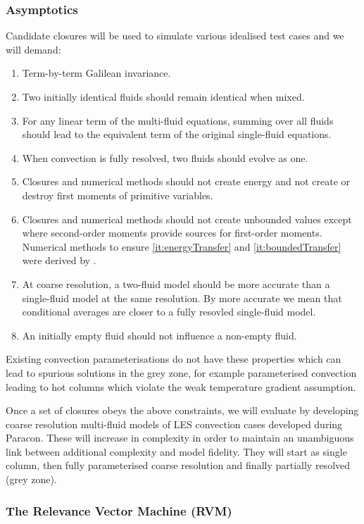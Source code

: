 \documentclass[11pt,a4paper]{article}
\begin{document}
\subsubsection*{Asymptotics}

Candidate closures will be used to simulate various idealised test cases and we will demand:
\begin{enumerate}
\item Term-by-term Galilean invariance.
\item Two initially identical fluids should remain identical when mixed.
\item For any linear term of the multi-fluid equations, summing over all fluids should lead to the equivalent term of the original single-fluid equations.
\item  When convection is fully resolved, two fluids should evolve as one.
\item\label{it:energyTransfer} Closures and numerical methods should not create energy and not create or destroy first moments of primitive variables.
\item\label{it:boundedTransfer} Closures and numerical methods should not create unbounded values except where second-order moments provide sources for first-order moments.  Numerical methods to ensure \ref{it:energyTransfer} and \ref{it:boundedTransfer} were derived by \cite{MWH20}.
\item At coarse resolution, a two-fluid model should be more accurate than a single-fluid model at the same resolution. By more accurate we mean that conditional averages are closer to a fully resovled single-fluid model.
\item An initially empty fluid should not influence a non-empty fluid.
\end{enumerate}
Existing convection parameterisations do not have these properties which can lead to spurious solutions in the grey zone, for example parameterised convection leading to hot columns which violate the weak temperature gradient assumption.

Once a set of closures obeys the above constraints, we will evaluate by developing coarse resolution multi-fluid models of LES convection cases developed during Paracon. These will increase in complexity in order to maintain an unambiguous link between additional complexity and model fidelity. They will start as single column, then fully parameterised coarse resolution and finally partially resolved (grey zone). 

\subsubsection*{The Relevance Vector Machine (RVM)}
\end{document}
